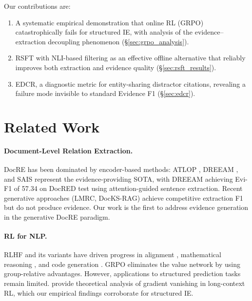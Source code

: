 \documentclass[11pt,a4paper]{article}
\begin{document}
Our contributions are:
\begin{enumerate}
    \item A systematic empirical demonstration that online RL (GRPO) catastrophically fails for structured IE, with analysis of the evidence--extraction decoupling phenomenon (\S\ref{sec:grpo_analysis}).
    \item RSFT with NLI-based filtering as an effective offline alternative that reliably improves both extraction and evidence quality (\S\ref{sec:rsft_results}).
    \item EDCR, a diagnostic metric for entity-sharing distractor citations, revealing a failure mode invisible to standard Evidence F1 (\S\ref{sec:edcr}).
\end{enumerate}

\section{Related Work}
\label{sec:related}

\paragraph{Document-Level Relation Extraction.}
DocRE has been dominated by encoder-based methods: ATLOP \citep{zhou2021atlop}, DREEAM \citep{ma2023dreeam}, and SAIS \citep{xie2022sais} represent the evidence-providing SOTA, with DREEAM achieving Evi-F1 of 57.34 on DocRED test using attention-guided sentence extraction.
Recent generative approaches (LMRC, DocKS-RAG) achieve competitive extraction F1 but do not produce evidence.
Our work is the first to address evidence generation in the generative DocRE paradigm.

\paragraph{RL for NLP.}
RLHF and its variants have driven progress in alignment \citep{ouyang2022training}, mathematical reasoning \citep{deepseek2025r1,shao2024deepseekmath}, and code generation \citep{le2022coderl}.
GRPO \citep{shao2024deepseekmath} eliminates the value network by using group-relative advantages.
However, applications to structured prediction tasks remain limited.
\citet{longrlvr2026} provide theoretical analysis of gradient vanishing in long-context RL, which our empirical findings corroborate for structured IE.
\end{document}
